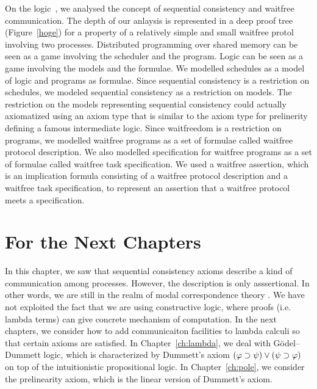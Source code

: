  On the logic~\iec, we analysed the concept of sequential consistency and waitfree
 communication.
 The depth of our anlaysis is represented in a deep proof tree (Figure~\ref{hoge}) for a
 property of a relatively simple and small waitfree protol involving two processes.
 Distributed programming over shared memory can be seen as a game involving the scheduler
 and the program.
 Logic can be seen as a game involving the models and the formulae.
 We modelled schedules as a model of logic and programs as formulae.
 Since sequential consistency is a restriction on schedules,
 we modeled sequential consistency as a restriction on models.
 The restriction on the models representing sequential consistency could actually
 axiomatized using an axiom type that is similar to the axiom type for prelinerity defining
 a famous intermediate logic.
 Since waitfreedom is a restriction on programs,
 we modelled waitfree programs as a set of formulae called waitfree protocol description.
 We also modelled specification for waitfree programs as a set of formulae called waitfree
 task specification.
 We used a waitfree assertion, which is
 an implication formula consisting of a waitfree protocol description and a
 waitfree task specification,
 to represent
 an assertion that a waitfree protocol meets a specification.

\section{For the Next Chapters}

In this chapter, we saw that sequential consistency axioms
describe a kind of communication among processes.
However, the description is only asssertional.  In other words, we are
still in the realm of modal correspondence theory .
We have not exploited the fact that we are using constructive logic,
where proofs (i.e. lambda terms) can give concrete mechanism of
computation.  In the next chapters, we consider how to add communicaiton
facilities to lambda calculi so that certain axioms are satisfied.
In Chapter~\ref{ch:lambda}, we deal with G\"odel--Dummett logic, which is
characterized by Dummett's axiom $(\varphi\supset\psi)\lor (\psi\supset\varphi)$ on
top of the intuitionistic propositional logic.
In Chapter~\ref{ch:pole}, we consider the prelinearity axiom, which is
the linear version of Dummett's axiom.
